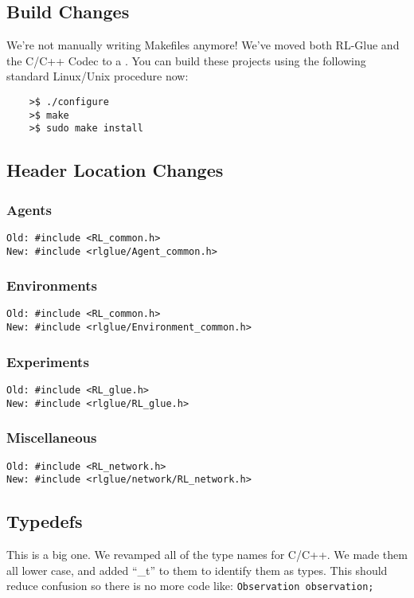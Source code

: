 \documentclass[11pt]{article}
\begin{document}
\subsection{Build Changes}
We're not manually writing Makefiles anymore!  We've moved both RL-Glue and the C/C++ Codec to a .
You can build these projects using the following standard Linux/Unix procedure now:
\begin{verbatim}
	>$ ./configure
	>$ make
	>$ sudo make install
\end{verbatim}

\subsection{Header Location Changes}
\subsubsection{Agents}
\begin{verbatim}
Old: #include <RL_common.h>
New: #include <rlglue/Agent_common.h>
\end{verbatim}

\subsubsection{Environments}
\begin{verbatim}
Old: #include <RL_common.h>
New: #include <rlglue/Environment_common.h>
\end{verbatim}

\subsubsection{Experiments}
\begin{verbatim}
Old: #include <RL_glue.h>
New: #include <rlglue/RL_glue.h>
\end{verbatim}

\subsubsection{Miscellaneous}
\begin{verbatim}
Old: #include <RL_network.h>
New: #include <rlglue/network/RL_network.h>
\end{verbatim}

\subsection{Typedefs}
This is a big one. We revamped all of the type names for C/C++.  We made them all lower case, and added ``\_t'' to them to identify them as types.  This should reduce confusion so there is no more code like:\newline
\texttt{Observation observation;}
\end{document}
